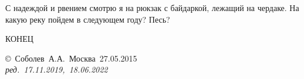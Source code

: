 С надеждой и рвением смотрю я на рюкзак с байдаркой, лежащий на чердаке. На какую реку пойдем в следующем году? Песь?
\begin{center}
\end{center}

\begin{center}
	\Large {КОНЕЦ}
\end{center}
\vspace{\fill}
\begin{flushright}
	\copyright~Соболев~А.А.~Москва~27.05.2015\\
	\textit{ред.~17.11.2019,~18.06.2022}
\end{flushright}



